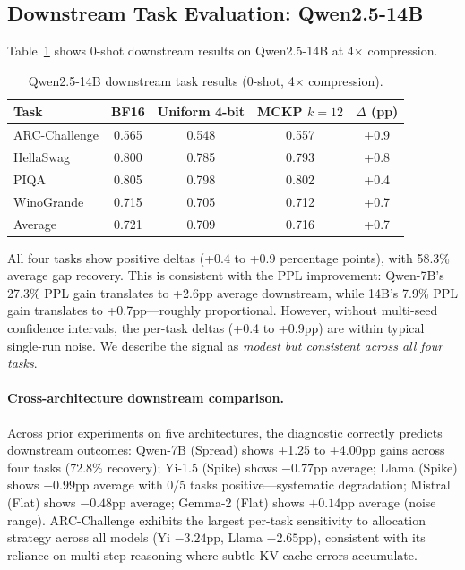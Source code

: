 \documentclass[11pt,a4paper]{article}
\begin{document}
\subsection{Downstream Task Evaluation: Qwen2.5-14B}
\label{sec:downstream_14b}

Table~\ref{tab:14b_downstream} shows 0-shot downstream results on Qwen2.5-14B at 4$\times$ compression.

\begin{table}[t]
\centering
\caption{Qwen2.5-14B downstream task results (0-shot, 4$\times$ compression).}
\label{tab:14b_downstream}
\begin{tabular}{lcccc}
\toprule
Task & BF16 & Uniform 4-bit & MCKP $k{=}12$ & $\Delta$ (pp) \\
\midrule
ARC-Challenge & 0.565 & 0.548 & 0.557 & +0.9 \\
HellaSwag     & 0.800 & 0.785 & 0.793 & +0.8 \\
PIQA          & 0.805 & 0.798 & 0.802 & +0.4 \\
WinoGrande    & 0.715 & 0.705 & 0.712 & +0.7 \\
\midrule
Average       & 0.721 & 0.709 & 0.716 & +0.7 \\
\bottomrule
\end{tabular}
\end{table}

All four tasks show positive deltas (+0.4 to +0.9 percentage points), with 58.3\% average gap recovery.
This is consistent with the PPL improvement: Qwen-7B's 27.3\% PPL gain translates to +2.6pp average downstream, while 14B's 7.9\% PPL gain translates to +0.7pp---roughly proportional.
However, without multi-seed confidence intervals, the per-task deltas (+0.4 to +0.9pp) are within typical single-run noise.
We describe the signal as \emph{modest but consistent across all four tasks}.

\paragraph{Cross-architecture downstream comparison.}
Across prior experiments on five architectures, the diagnostic correctly predicts downstream outcomes:
Qwen-7B (Spread) shows +1.25 to +4.00pp gains across four tasks (72.8\% recovery);
Yi-1.5 (Spike) shows $-0.77$pp average;
Llama (Spike) shows $-0.99$pp average with 0/5 tasks positive---systematic degradation;
Mistral (Flat) shows $-0.48$pp average;
Gemma-2 (Flat) shows $+0.14$pp average (noise range).
ARC-Challenge exhibits the largest per-task sensitivity to allocation strategy across all models (Yi $-3.24$pp, Llama $-2.65$pp), consistent with its reliance on multi-step reasoning where subtle KV cache errors accumulate.
\end{document}
